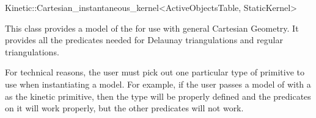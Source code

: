 

\begin{ccRefClass}{Kinetic::Cartesian_instantaneous_kernel<ActiveObjectsTable, StaticKernel>}  %


\ccDefinition
  
This class provides a model of the  for
use with general Cartesian Geometry. It provides all the predicates
needed for Delaunay triangulations and regular triangulations.

For technical reasons, the user must pick out one particular type of
primitive to use when instantiating a model. For example, if the user
passes a model of  with a
 as the kinetic primitive, then the type
 will be properly defined and the predicates on it will
work properly, but the other predicates will not work.


\ccIsModel


\end{ccRefClass}


